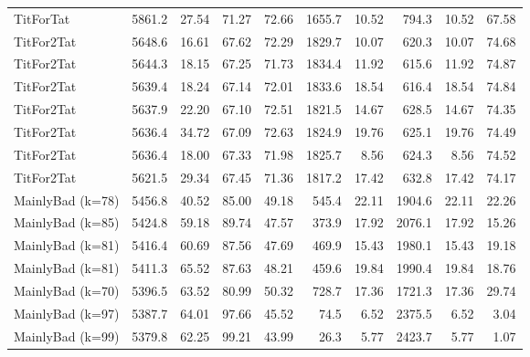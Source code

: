 \documentclass[journal,a4paper,10pt,twoside]{IEEEtran} %
\begin{document}
\begin{table}[ht]
\begin{tabular}{l|rrrr|rrrrr}
		TitForTat         & 5861.2 &  27.54 &  71.27 &   72.66 & 1655.7 &                  10.52 &  794.3 &                   10.52 &    67.58 \\
		TitFor2Tat        & 5648.6 &  16.61 &  67.62 &   72.29 & 1829.7 &                  10.07 &  620.3 &                   10.07 &    74.68 \\
		TitFor2Tat        & 5644.3 &  18.15 &  67.25 &   71.73 & 1834.4 &                  11.92 &  615.6 &                   11.92 &    74.87 \\
		TitFor2Tat        & 5639.4 &  18.24 &  67.14 &   72.01 & 1833.6 &                  18.54 &  616.4 &                   18.54 &    74.84 \\
		TitFor2Tat        & 5637.9 &  22.20 &  67.10 &   72.51 & 1821.5 &                  14.67 &  628.5 &                   14.67 &    74.35 \\
		TitFor2Tat        & 5636.4 &  34.72 &  67.09 &   72.63 & 1824.9 &                  19.76 &  625.1 &                   19.76 &    74.49 \\
		TitFor2Tat        & 5636.4 &  18.00 &  67.33 &   71.98 & 1825.7 &                   8.56 &  624.3 &                    8.56 &    74.52 \\
		TitFor2Tat        & 5621.5 &  29.34 &  67.45 &   71.36 & 1817.2 &                  17.42 &  632.8 &                   17.42 &    74.17 \\
		MainlyBad (k=78)  & 5456.8 &  40.52 &  85.00 &   49.18 &  545.4 &                  22.11 & 1904.6 &                   22.11 &    22.26 \\
		MainlyBad (k=85)  & 5424.8 &  59.18 &  89.74 &   47.57 &  373.9 &                  17.92 & 2076.1 &                   17.92 &    15.26 \\
		MainlyBad (k=81)  & 5416.4 &  60.69 &  87.56 &   47.69 &  469.9 &                  15.43 & 1980.1 &                   15.43 &    19.18 \\
		MainlyBad (k=81)  & 5411.3 &  65.52 &  87.63 &   48.21 &  459.6 &                  19.84 & 1990.4 &                   19.84 &    18.76 \\
		MainlyBad (k=70)  & 5396.5 &  63.52 &  80.99 &   50.32 &  728.7 &                  17.36 & 1721.3 &                   17.36 &    29.74 \\
		MainlyBad (k=97)  & 5387.7 &  64.01 &  97.66 &   45.52 &   74.5 &                   6.52 & 2375.5 &                    6.52 &     3.04 \\
		MainlyBad (k=99)  & 5379.8 &  62.25 &  99.21 &   43.99 &   26.3 &                   5.77 & 2423.7 &                    5.77 &     1.07 \\

\end{tabular}
\end{table}
\end{document}
